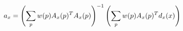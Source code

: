 \begin{equation}
    \footnotesize
    \label{eq:optimal-parameter-affine-weighted-halved}
    a_x = \left (\sum_p w(p) A_x(p)^T A_x(p) \right )^{-1} \left (\sum_p w(p) A_x(p)^T d_x(x) \right)
\end{equation}